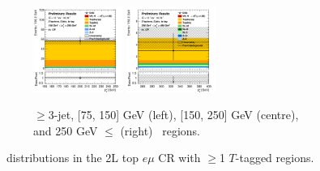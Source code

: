 \begin{figure}[h!]
\begin{subfigure}[b]{\textwidth}
        \includegraphics[width=0.32\textwidth]{Images/VH/Own_fit/postfit_VHcc/Region_distpTV_BMax250_BMin150_Dtopemucr_J3_TTypeta_T2_L2_Y6051_GlobalFit_conditionnal_mu1.png}
        \includegraphics[width=0.32\textwidth]{Images/VH/Own_fit/postfit_VHcc/Region_distpTV_BMax400_BMin250_Dtopemucr_J3_TTypeta_T2_L2_Y6051_GlobalFit_conditionnal_mu1.png}
        \caption{$\geq$3-jet, [75, 150] GeV (left), [150, 250] GeV (centre), and 250  GeV $\leq$ (right) \ptv\ regions.}
        \label{fig:plots_VHcc_2L_topCRemu_3J}
    \end{subfigure}
    \caption{\ptv\ distributions in the 2L top $e\mu$ CR with $\geq$1 $T$-tagged regions.}
    \label{fig:plots_VHcc_2L_topCRemu}
\end{figure}

